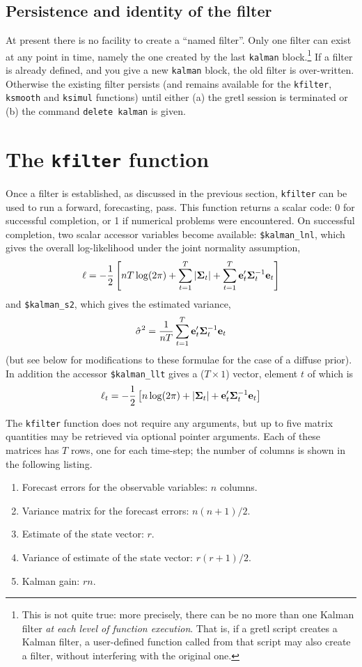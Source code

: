 \documentclass[a4paper]{article}
\newcommand{\prederr}{\ensuremath\mathbf{e}}
\newcommand{\predvar}{\ensuremath{\bm\Sigma}}
\begin{document}
\subsection{Persistence and identity of the filter}

At present there is no facility to create a ``named filter''.  Only
one filter can exist at any point in time, namely the one created by
the last \texttt{kalman} block.\footnote{This is not quite true: more
  precisely, there can be no more than one Kalman filter \textit{at
    each level of function execution}.  That is, if a gretl script
  creates a Kalman filter, a user-defined function called from that
  script may also create a filter, without interfering with the
  original one.}  If a filter is already defined, and you give a new
\texttt{kalman} block, the old filter is over-written.  Otherwise the
existing filter persists (and remains available for the
\texttt{kfilter}, \texttt{ksmooth} and \texttt{ksimul} functions)
until either (a) the gretl session is terminated or (b) the command
\texttt{delete kalman} is given.


\section{The \texttt{kfilter} function}

Once a filter is established, as discussed in the previous section,
\texttt{kfilter} can be used to run a forward, forecasting, pass.
This function returns a scalar code: 0 for successful completion, or 1
if numerical problems were encountered.  On successful completion, two
scalar accessor variables become available: \verb+$kalman_lnl+, which
gives the overall log-likelihood under the joint normality assumption,
%
\[
  \ell = -\frac{1}{2} \left[nT \log(2 \pi) + \sum_{t=1}^T\left|\predvar_t\right| + 
    \sum_{t=1}^T\prederr_t'\predvar_t^{-1} \prederr_t
  \right]
\]
%
and \verb+$kalman_s2+, which gives the estimated variance,
%
\[
\hat{\sigma}^2 = \frac{1}{nT} 
   \sum_{t=1}^T\prederr_t'\predvar_t^{-1} \prederr_t
\]
(but see below for modifications to these formulae for the case of a
diffuse prior).  In addition the accessor \verb+$kalman_llt+ gives a
($T \times 1$) vector, element $t$ of which is
%
\[
  \ell_t = -\frac{1}{2} \left[n \log(2 \pi) + \left|\predvar_t\right| + 
    \prederr_t'\predvar_t^{-1} \prederr_t
  \right]
\]
%

The \texttt{kfilter} function does not require any arguments, but up
to five matrix quantities may be retrieved via optional pointer
arguments.  Each of these matrices has $T$ rows, one for each
time-step; the number of columns is shown in the following listing.
%
\begin{enumerate}
\item Forecast errors for the observable variables: $n$ columns.
\item Variance matrix for the forecast errors: $n(n+1)/2$.
\item Estimate of the state vector: $r$.
\item Variance of estimate of the state vector: $r(r+1)/2$.
\item Kalman gain: $rn$.
\end{enumerate}
\end{document}
